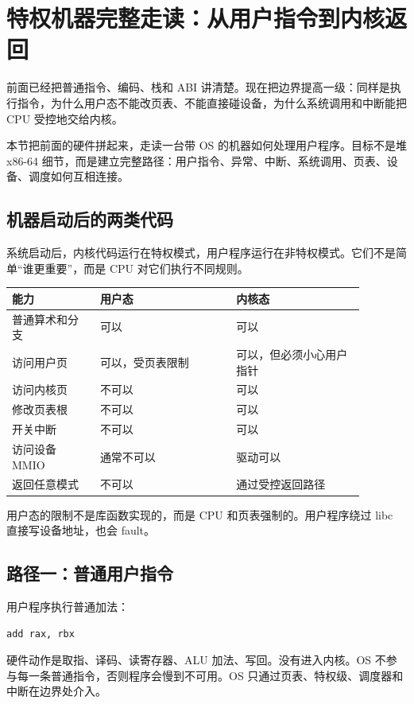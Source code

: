 \section{特权机器完整走读：从用户指令到内核返回}

前面已经把普通指令、编码、栈和 ABI 讲清楚。现在把边界提高一级：同样是执行指令，为什么用户态不能改页表、不能直接碰设备，为什么系统调用和中断能把 CPU 受控地交给内核。

本节把前面的硬件拼起来，走读一台带 OS 的机器如何处理用户程序。目标不是堆 x86-64 细节，而是建立完整路径：用户指令、异常、中断、系统调用、页表、设备、调度如何互相连接。

\subsection{机器启动后的两类代码}

系统启动后，内核代码运行在特权模式，用户程序运行在非特权模式。它们不是简单“谁更重要”，而是 CPU 对它们执行不同规则。

\begin{longtable}{p{0.22\linewidth}p{0.34\linewidth}p{0.32\linewidth}}
\toprule
能力 & 用户态 & 内核态 \\
\midrule
普通算术和分支 & 可以 & 可以 \\
访问用户页 & 可以，受页表限制 & 可以，但必须小心用户指针 \\
访问内核页 & 不可以 & 可以 \\
修改页表根 & 不可以 & 可以 \\
开关中断 & 不可以 & 可以 \\
访问设备 MMIO & 通常不可以 & 驱动可以 \\
返回任意模式 & 不可以 & 通过受控返回路径 \\
\bottomrule
\end{longtable}

用户态的限制不是库函数实现的，而是 CPU 和页表强制的。用户程序绕过 libc 直接写设备地址，也会 fault。

\subsection{路径一：普通用户指令}

用户程序执行普通加法：

\begin{lstlisting}
add rax, rbx
\end{lstlisting}

硬件动作是取指、译码、读寄存器、ALU 加法、写回。没有进入内核。OS 不参与每一条普通指令，否则程序会慢到不可用。OS 只通过页表、特权级、调度器和中断在边界处介入。

